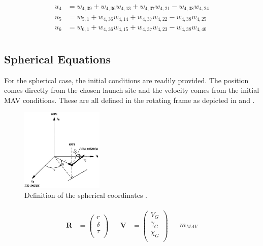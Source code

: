 \begin{equation} \label{eq:finalAccAuxF}
\begin{split}
u_{4} &= w_{4,39}+w_{4,36}w_{4,13}+w_{4,37}w_{4,21}-w_{4,38}w_{4,24} \\
u_{5} &= w_{5,1}+w_{4,36}w_{4,14}+w_{4,37}w_{4,22}-w_{4,38}w_{4,25} \\
u_{6} &= w_{6,1}+w_{4,36}w_{4,15}+w_{4,37}w_{4,23}-w_{4,38}w_{4,40} \\
\end{split}
\end{equation}
















\subsection{Spherical Equations}
\label{subsec:sphereq}
For the spherical case, the initial conditions are readily provided. The position comes directly from the chosen launch site and the velocity comes from the initial \ac{MAV} conditions. These are all defined in the rotating frame as depicted in  and .

 \begin{figure}[H]
\centering
\includegraphics[width=0.35\textwidth]{figures/tsi/spherical_mooij1994motion.jpg}
\caption{Definition of the spherical coordinates \citep{mooij1994motion}.}
\label{fig:spherical_mooij1994motion}
\end{figure}

\begin{align} \label{eq:spherVecDef}
\begin{split}
\mathbf{R} &= 
\begin{pmatrix}
r \\
\delta \\
\tau \\
\end{pmatrix}
\end{split}
&
\begin{split}
\mathbf{V} &= 
\begin{pmatrix}
V_{G} \\
\gamma_{G} \\
\chi_{G} \\
\end{pmatrix}
\end{split}
&
\begin{split}
m_{MAV}
\end{split}
\end{align}

